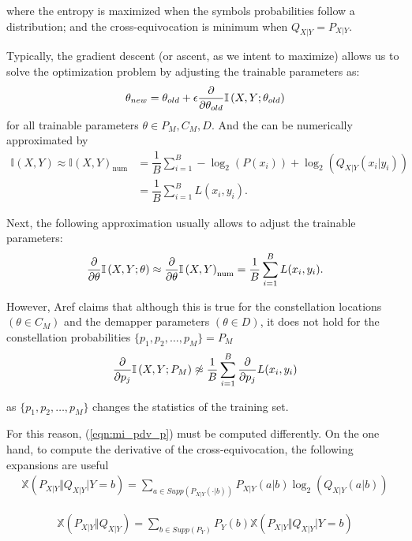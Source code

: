 where the entropy is maximized when the symbols probabilities follow a  distribution; and the cross-equivocation is minimum when $Q_{X|Y} = P_{X|Y}$.

Typically, the gradient descent (or ascent, as we intent to maximize) allows us to solve the optimization problem by adjusting the trainable parameters as:
\begin{align}
	\theta_{new} = \theta_{old} + \epsilon \pdv{\theta_{old}} \mathbb{I} \left(X , Y ; \theta_{old} \right)
\end{align}
for all trainable parameters $\theta \in P_M, C_M, D$. And the  can be numerically approximated by
\begin{align}
	\mathbb{I} \left(X , Y\right) \approx \mathbb{I} \left(X , Y\right)_{\text{num}} &= \dfrac{1}{B} \sum \limits_{i = 1}^{B} - \log_2(P(x_i)) + \log_2(Q_{X|Y}(x_i|y_i))\\
	&= \dfrac{1}{B} \sum \limits_{i = 1}^{B} L(x_i, y_i).
\end{align}

Next, the following approximation usually allows to adjust the trainable parameters:
\begin{align}
	\pdv{\theta} \mathbb{I} \left(X , Y ; \theta \right) \approx \pdv{\theta} \mathbb{I} \left(X , Y\right)_{\text{num}} = \dfrac{1}{B} \sum \limits_{i = 1}^{B} L(x_i, y_i).
\end{align}

However, Aref claims that although this is true for the constellation locations $(\theta \in C_M)$ and the demapper parameters $(\theta \in D)$, it does not hold for the constellation probabilities $\{p_1, p_2, \dots, p_M\} = P_M$
\begin{align}
\label{eqn:mi_pdv_p}
	\pdv{p_j} \mathbb{I} \left(X , Y ; P_M \right) \not\approx \dfrac{1}{B} \sum \limits_{i = 1}^{B} \pdv{p_j} L(x_i, y_i)
\end{align}

as $\{p_1, p_2, \dots, p_M\}$ changes the statistics of the training set.

For this reason, (\ref{eqn:mi_pdv_p}) must be computed differently. On the one hand, to compute the derivative of the cross-equivocation, the following expansions are useful
\begin{align}
	\mathbb{X}\left(P_{X|Y} \Vert Q_{X|Y} \vert Y=b \right) = \sum \limits_{a \in Supp(P_{X|Y}(\cdot|b))} P_{X|Y}(a|b) \log_2(Q_{X|Y}(a|b))
\end{align}

\begin{align}
	\mathbb{X}\left(P_{X|Y} \Vert Q_{X|Y}\right) = \sum \limits_{b \in Supp(P_Y)} P_Y(b) \mathbb{X}\left( P_{X|Y} \Vert Q_{X|Y} \vert Y=b \right) 
\end{align}

